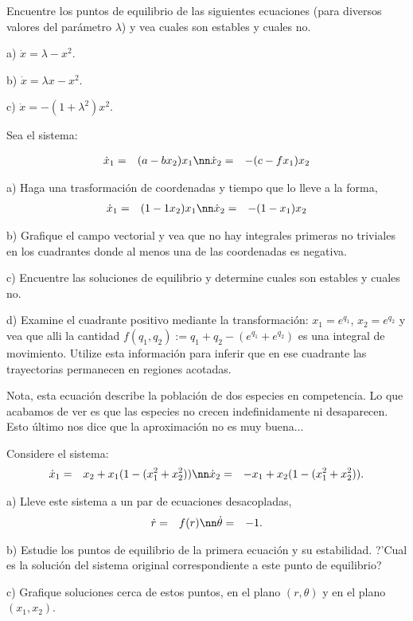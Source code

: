%
%

\epro
Encuentre los puntos de equilibrio de las siguientes ecuaciones (para
diversos valores del par\'ametro $\lambda$) y vea cuales son estables
y cuales no.

a) $\dot{x} = \lambda - x^2$.

b) $\dot{x} = \lambda x  - x^2$.

c) $\dot{x} = -(1+\lambda^2)x^2$.



Sea el sistema:

\begin{eqnarray}
  \label{eq:Volterra_Lotka}
  \dot{x}_1 &=& (a-bx_2)x_1 \nn
  \dot{x}_2 &=& -(c-f x_1)x_2
\end{eqnarray}

a) Haga una trasformaci\'on de coordenadas y tiempo que lo lleve a la forma,
\begin{eqnarray}
  \label{eq:Volterra_Lotka_adim}
  \dot{x}_1 &=& (1 - 1x_2)x_1 \nn
  \dot{x}_2 &=& -(1 - x_1)x_2
\end{eqnarray}
%

b) Grafique el campo vectorial y vea que no hay integrales primeras no
triviales en los cuadrantes donde al menos una de las coordenadas es
negativa.

c) Encuentre las soluciones de equilibrio y determine cuales son 
estables y cuales no.

d) Examine el cuadrante positivo mediante la transformaci\'on:
$x_1 = e^{q_1}$, $x_2 = e^{q_2}$ y vea que alli la cantidad
$f(q_1,q_2) := q_1 + q_2 -(e^{q_1} + e^{q_2})$ es una integral
de movimiento. Utilize esta informaci\'on para inferir que en ese
cuadrante las trayectorias permanecen en regiones acotadas.

Nota, esta ecuaci\'on describe la poblaci\'on de dos especies en competencia.
Lo que acabamos de ver es que las especies no crecen indefinidamente ni
desaparecen. Esto \'ultimo nos dice que la aproximaci\'on no es
muy buena...
\epro

Considere el sistema:
\begin{eqnarray}
  \label{eq:Ciclo_Limite_Prob}
  \dot{x}_1 &=& x_2 + x_1(1-(x_1^2+x_2^2)) \nn
  \dot{x}_2 &=& -x_1 + x_2(1-(x_1^2+x_2^2)).
\end{eqnarray}
%

a) Lleve este sistema a un par de ecuaciones desacopladas,
\begin{eqnarray}
  \label{eq:Ciclo_Limite_Prob_des}
  \dot{r} &=&  f(r) \nn
  \dot{\theta} &=& -1.
\end{eqnarray}
%

b) Estudie los puntos de equilibrio de la primera ecuaci\'on y su estabilidad.
?'Cual es la soluci\'on del sistema original correspondiente a este punto
de equilibrio?


c) Grafique soluciones cerca de estos puntos, en el plano $(r,\theta)$ y en el
plano $(x_1,x_2)$.


